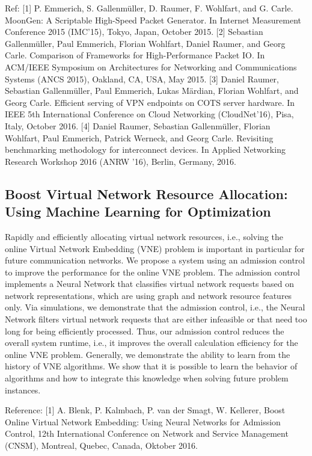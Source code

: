 Ref: [1] P. Emmerich, S. Gallenmüller, D. Raumer, F. Wohlfart, and G. Carle.
MoonGen: A Scriptable High-Speed Packet Generator. In Internet
Measurement Conference 2015 (IMC’15), Tokyo,
Japan, October 2015.
[2] Sebastian Gallenmüller, Paul Emmerich, Florian Wohlfart, Daniel
Raumer, and Georg Carle. Comparison of Frameworks for High-Performance
Packet IO. In ACM/IEEE Symposium on
Architectures for Networking and Communications Systems (ANCS 2015),
Oakland, CA, USA, May 2015.
[3] Daniel Raumer, Sebastian Gallenmüller, Paul Emmerich, Lukas Märdian,
Florian Wohlfart, and Georg Carle. Efficient serving of VPN endpoints on
COTS server hardware. In IEEE 5th
International Conference on Cloud Networking (CloudNet’16), Pisa, Italy,
October 2016.
[4] Daniel Raumer, Sebastian Gallenmüller, Florian Wohlfart, Paul
Emmerich, Patrick Werneck, and Georg Carle. Revisiting benchmarking
methodology for interconnect devices. In Applied
Networking Research Workshop 2016 (ANRW ’16), Berlin, Germany, 2016.


\subsection{Boost Virtual Network Resource Allocation: Using Machine Learning for Optimization}

Rapidly and efficiently allocating virtual network resources, i.e.,
solving the online Virtual Network Embedding (VNE) problem is
important in particular for future communication networks. We
propose a system using an admission control to improve the performance
for the online VNE problem. The admission control implements a Neural
Network that classifies virtual network requests based on network
representations, which are using graph and network resource features
only. Via simulations, we demonstrate that the admission control,
i.e., the Neural Network filters virtual network requests that are
either infeasible or that need too long for being efficiently
processed. Thus, our admission control reduces the overall system
runtime, i.e., it improves the overall calculation efficiency for
the online VNE problem.
Generally, we demonstrate the ability to learn from the history
of VNE algorithms. We show that it is possible to learn the behavior
of algorithms and how to integrate this knowledge when solving future
problem instances.

Reference:
[1] A. Blenk, P. Kalmbach, P. van der Smagt, W. Kellerer, Boost Online
Virtual Network Embedding: Using Neural Networks for Admission Control,
12th International Conference on Network and Service Management (CNSM),
 Montreal, Quebec, Canada, Oktober 2016.

